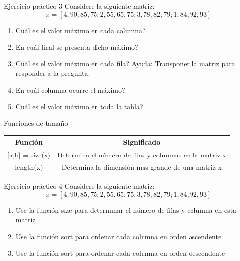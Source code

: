 \documentclass{bredelebeamer}
\begin{document}
\begin{frame}{Ejercicio práctico 3}
Considere la siguiente matriz:
\begin{equation*}
x = [4, 90, 85, 75 ; 2, 55, 65, 75 ; 3, 78, 82, 79 ; 1, 84, 92, 93]
\end{equation*}
\begin{enumerate}
\item Cuál es el valor máximo en cada columna?
\item En cuál final se presenta dicho máximo?
\item Cuál es el valor máximo en cada fila? Ayuda: Transponer la matriz para responder a la pregunta.
\item En cuál columna ocurre el máximo?
\item Cuál es el valor máximo en toda la tabla?
\end{enumerate}
\end{frame}

\begin{frame}{Funciones de tamaño}
\begin{table}[]
\centering
\begin{tabular}{|c|c|}
\hline
Función             & Significado                                            \\ \hline
{[}a,b{]} = size(x) & Determina el número de filas y columnas en la matriz x \\ \hline
length(x)           & Determina la dimensión más grande de una matriz x      \\ \hline
\end{tabular}
\end{table}
\end{frame}

\begin{frame}{Ejercicio práctico 4}
Considere la siguiente matriz:
\begin{equation*}
x = [4, 90, 85, 75 ; 2, 55, 65, 75 ; 3, 78, 82, 79 ; 1, 84, 92, 93]
\end{equation*}
\begin{enumerate}
\item Use la función size para determinar el número de filas y columna en esta matriz
\item Use la función sort para ordenar cada columna en orden ascendente
\item Use la función sort para ordenar cada columna en orden descendente
\end{enumerate}
\end{frame}
\end{document}
